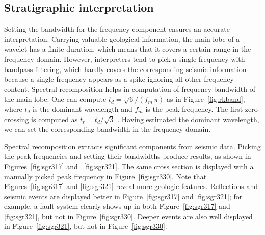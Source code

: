 

\subsection{Stratigraphic interpretation}
Setting the bandwidth for the frequency component ensures an accurate interpretation. Carrying valuable geological information, the main lobe of a wavelet has a finite duration, which means that it covers a certain range in the frequency domain. However, interpreters tend to pick a single frequency with bandpass filtering, which hardly covers the corresponding seismic information because a single frequency appears as a spike ignoring all other frequency content. Spectral recomposition helps in computation of frequency bandwidth of the main lobe. One can compute $t_d=\sqrt{6}/({f_m\,\pi})$ as in Figure~\ref{fig:rkband}, where $t_d$ is the dominant wavelength and $f_m$ is the peak frequency. The first zero crossing is computed as $t_r=t_d/\sqrt{3}$ \cite[]{Sheriff}. Having estimated the dominant wavelength, we can set the corresponding bandwidth in the frequency domain.


Spectral recomposition extracts significant components from seismic data. Picking the peak frequencies and setting their bandwidths produce results, as shown in Figures~\ref{fig:sgr317} and ~\ref{fig:sgr321}. The same cross section is displayed with a manually picked peak frequency in Figure~\ref{fig:sgr330}. Note that Figures~\ref{fig:sgr317} and \ref{fig:sgr321} reveal more geologic features. Reflections and seismic events are displayed better in Figure~\ref{fig:sgr317} and \ref{fig:sgr321}; for example, a fault system clearly shows up in both Figure~\ref{fig:sgr317} and \ref{fig:sgr321}, but not in Figure~\ref{fig:sgr330}. Deeper events are also well displayed in Figure~\ref{fig:sgr321}, but not in Figure~\ref{fig:sgr330}.

